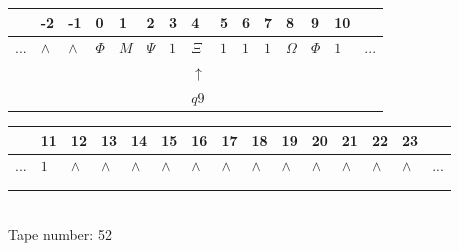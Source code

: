 \documentclass[11pt]{article}
\begin{document}
\begin{table}[H]
\centering
\begin{tabular}{lllllllllllllll}
 & -2 & -1 & 0 & 1 & 2 & 3 & 4 & 5 & 6 & 7 & 8 & 9 & 10 & \\
\hline
$...$ & \multicolumn{1}{|l|}{$\wedge$} & \multicolumn{1}{|l|}{$\wedge$} & \multicolumn{1}{|l|}{$\Phi$} & \multicolumn{1}{|l|}{$M$} & \multicolumn{1}{|l|}{$\Psi$} & \multicolumn{1}{|l|}{$1$} & \multicolumn{1}{|l|}{$\Xi$} & \multicolumn{1}{|l|}{$1$} & \multicolumn{1}{|l|}{$1$} & \multicolumn{1}{|l|}{$1$} & \multicolumn{1}{|l|}{$\Omega$} & \multicolumn{1}{|l|}{$\Phi$} & \multicolumn{1}{|l|}{$1$} & $...$\\
\hline
&  &  &  &  &  &  & $\uparrow$ &  &  &  &  &  &  &  \\
&  &  &  &  &  &  & $ q9 $ &  &  &  &  &  &  &  \\
\end{tabular}
\begin{tabular}{lllllllllllllll}
 & 11 & 12 & 13 & 14 & 15 & 16 & 17 & 18 & 19 & 20 & 21 & 22 & 23 & \\
\hline
$...$ & \multicolumn{1}{|l|}{$1$} & \multicolumn{1}{|l|}{$\wedge$} & \multicolumn{1}{|l|}{$\wedge$} & \multicolumn{1}{|l|}{$\wedge$} & \multicolumn{1}{|l|}{$\wedge$} & \multicolumn{1}{|l|}{$\wedge$} & \multicolumn{1}{|l|}{$\wedge$} & \multicolumn{1}{|l|}{$\wedge$} & \multicolumn{1}{|l|}{$\wedge$} & \multicolumn{1}{|l|}{$\wedge$} & \multicolumn{1}{|l|}{$\wedge$} & \multicolumn{1}{|l|}{$\wedge$} & \multicolumn{1}{|l|}{$\wedge$} & $...$\\
\hline
&  &  &  &  &  &  &  &  &  &  &  &  &  &  \\
&  &  &  &  &  &  &  &  &  &  &  &  &  &  \\
\end{tabular}
\\
Tape number: 52
\noindent\makebox[\linewidth]{\hdashrule{\textwidth}{1pt}{1pt}}\end{table}
\end{document}
